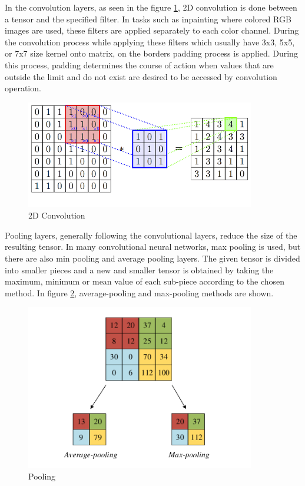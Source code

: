 In the convolution layers, as seen in the figure \ref{fig:convolution}, 2D convolution is done between a tensor and the specified filter. In tasks such as inpainting where colored RGB images are used, these filters are applied separately to each color channel. During the convolution process while applying these filters which usually have 3x3, 5x5, or 7x7 size kernel onto matrix, on the borders padding process is applied. During this process, padding determines the course of action when values that are outside the limit and do not exist are desired to be accessed by convolution operation.

\begin{figure}[h]
    \centering
    \includegraphics[width=10cm]{figures/chapter3/convolution.png}
    \caption{2D Convolution \cite{convolution_pooling}}
    \label{fig:convolution}
\end{figure}

Pooling layers, generally following the convolutional layers, reduce the size of the resulting tensor. In many convolutional neural networks, max pooling is used, but there are also min pooling and average pooling layers. The given tensor is divided into smaller pieces and a new and smaller tensor is obtained by taking the maximum, minimum or mean value of each sub-piece according to the chosen method. In figure \ref{fig:pooling}, average-pooling and max-pooling methods are shown.

\begin{figure}[h]
    \centering
    \includegraphics[width=10cm]{figures/chapter3/pooling.png}
    \caption{Pooling \cite{convolution_pooling}}
    \label{fig:pooling}
\end{figure}


